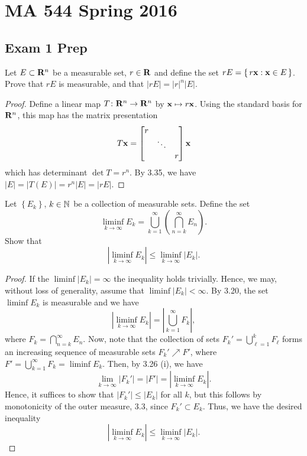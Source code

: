 \chapter{MA 544 Spring 2016}
\section{Exam 1 Prep}
\begin{problem}
Let $E\subset\mathbf{R}^n$ be a measurable set, $r\in\mathbf{R}$ and define the set
$rE=\left\{\,r\mathbf{x}:\mathbf{x}\in E\,\right\}$. Prove that $rE$ is
measurable, and that $|rE|=|r|^n|E|$.
\end{problem}
\begin{proof}
Define a linear map $T\colon\mathbf{R}^n\to\mathbf{R}^n$ by $\mathbf{x}\mapsto r\mathbf{x}$. Using
the standard basis for $\mathbf{R}^n$, this map has the matrix presentation
\begin{equation}
\label{eq:matrix-presentation}
T\mathbf{x}=
\begin{bmatrix}
r&\\
&\ddots\\
&&r
\end{bmatrix}\mathbf{x}
\end{equation}
which has determinant $\det T=r^n$. By 3.35, we have
$|E|=|T(E)|=r^n|E|=|rE|$.
\end{proof}

\begin{problem}
Let $\left\{ E_k \right\}$, $k\in\mathbb{N}$ be a collection of measurable
sets. Define the set
\[
\liminf_{k\to\infty} E_k
=\bigcup_{k=1}^\infty\left(\bigcap_{n=k}^\infty E_n\right).
\]
Show that
\[
\left|\liminf_{k\to\infty} E_k\right|\leq\liminf_{k\to\infty}\left|E_k\right|.
\]
\end{problem}
\begin{proof}
If the $\liminf\left|E_k\right|=\infty$ the inequality holds
trivially. Hence, we may, without loss of generality, assume that
$\liminf\left|E_k\right|<\infty$. By 3.20, the set $\liminf E_k$ is
measurable and we have
\begin{equation}
  \label{eq:limsup-rewrite}
\left|\liminf_{k\to\infty} E_k\right|
=\left|\bigcup_{k=1}^\infty F_k\right|,
\end{equation}
where $F_k=\bigcap_{n=k}^\infty E_n$. Now, note that the collection
of sets $F_k'=\bigcup_{\ell=1}^k F_\ell$ forms an increasing
sequence of measurable sets $F_k'\nearrow F'$, where
$F'=\bigcup_{k=1}^\infty F_k=\liminf E_k$. Then, by 3.26 (i), we have
\begin{equation}
  \label{eq:monotone-increasing-limit}
\lim_{k\to\infty}\left|F_k'\right|
=\left|F'\right|
=\left|\liminf_{k\to\infty} E_k\right|.
\end{equation}
Hence, it suffices to show that $\left|F_k'\right|\leq\left|E_k\right|$ for
all $k$, but this follows by monotonicity of the outer measure, 3.3, since
$F_k'\subset E_k$. Thus, we have the desired inequality
\begin{equation}
  \label{eq:meas-liminf-liminf-meas}
\left|\liminf_{k\to\infty} E_k\right|
\leq\liminf_{k\to\infty}\left|E_k\right|.
\end{equation}
\end{proof}

